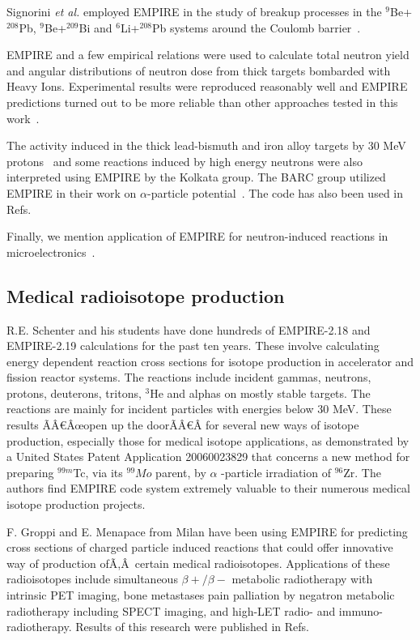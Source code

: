 Signorini \textit{et al.} employed EMPIRE in the study of breakup processes
in the $^9$Be+$^{208}$Pb, $^9$Be+$^{209}$Bi and $^6$Li+$^{208}$Pb systems
around the Coulomb barrier~\cite{signorini2004bps}.

EMPIRE and a few empirical relations were used to calculate total neutron
yield and angular distributions of neutron dose from thick targets bombarded
with Heavy Ions. Experimental results were reproduced reasonably well and
EMPIRE predictions turned out to be more reliable than other approaches
tested in this work~\cite{Nandy:07}.

The activity induced in the thick lead-bismuth and iron alloy targets by 30
MeV protons~\cite{Nandy:07a} and some reactions induced by high energy
neutrons were also interpreted using EMPIRE by the Kolkata group. The BARC
group utilized EMPIRE in their work on $\alpha$-particle potential~\cite%
{Kumar:06}. The code has also been used in Refs.~\cite{Said:06,
Elmaghraby:06, Pandey:07}

Finally, we mention application of EMPIRE for neutron-induced reactions in
microelectronics~\cite{wrobel2005unc}.

\subsection{Medical radioisotope production}

R.E. Schenter and his students have done hundreds of EMPIRE-2.18 and
EMPIRE-2.19 calculations for the past ten years. These involve calculating
energy dependent reaction cross sections for isotope production in
accelerator and fission reactor systems. The reactions include incident
gammas, neutrons, protons, deuterons, tritons, $^{3}$He and alphas on mostly
stable targets. The reactions are mainly for incident particles with
energies below 30 MeV. These results \~{A}\cents \^{A}\euro \^{A}\oe open up
the door\~{A}\cents \^{A}\euro \^{A} for several new ways of isotope
production, especially those for medical isotope applications, as
demonstrated by a United States Patent Application 20060023829 that concerns
a new method for preparing $^{99m}$Tc, via its $^{99}Mo$ parent, by $\alpha $%
-particle irradiation of $^{96}$Zr. The authors find EMPIRE code system
extremely valuable to their numerous medical isotope production projects.

F. Groppi and E. Menapace from Milan have been using EMPIRE for predicting
cross sections of charged particle induced reactions that could offer
innovative way of production of\~{A},\^{A}~certain medical radioisotopes.
Applications of these radioisotopes include simultaneous $\beta+/\beta-$
metabolic radiotherapy with intrinsic PET imaging, bone metastases pain
palliation by negatron metabolic radiotherapy including SPECT imaging, and
high-LET radio- and immuno-radiotherapy. Results of this research were
published in Refs.~\cite{Menapace:04, Menapace:05, Groppi:05, Groppi:05a,
Groppi:06, Alfassi:06, Persico:06}

